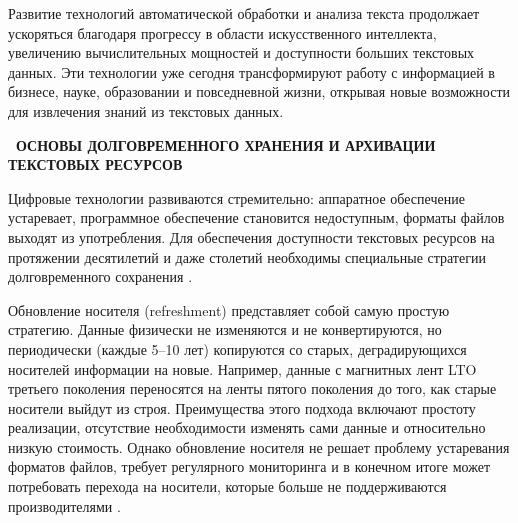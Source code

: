 \documentclass{SibFU-docs}
\begin{document}
Развитие технологий автоматической обработки и анализа текста продолжает ускоряться благодаря прогрессу в области искусственного интеллекта, увеличению вычислительных мощностей и доступности больших текстовых данных. Эти технологии уже сегодня трансформируют работу с информацией в бизнесе, науке, образовании и повседневной жизни, открывая новые возможности для извлечения знаний из текстовых данных.

\newpage

\begin{center}\textbf{\thesection\ ОСНОВЫ ДОЛГОВРЕМЕННОГО ХРАНЕНИЯ И АРХИВАЦИИ ТЕКСТОВЫХ РЕСУРСОВ}\end{center}
\vspace*{-1.5em}


Цифровые технологии развиваются стремительно: аппаратное обеспечение устаревает, программное обеспечение становится недоступным, форматы файлов выходят из употребления. Для обеспечения доступности текстовых ресурсов на протяжении десятилетий и даже столетий необходимы специальные стратегии долговременного сохранения \cite{Lucidea2024LongTermAccess, ETHLibrary2025DigitalPreservation}.

Обновление носителя (refreshment) представляет собой самую простую стратегию. Данные физически не изменяются и не конвертируются, но периодически (каждые 5–10 лет) копируются со старых, деградирующихся носителей информации на новые. Например, данные с магнитных лент LTO третьего поколения переносятся на ленты пятого поколения до того, как старые носители выйдут из строя. Преимущества этого подхода включают простоту реализации, отсутствие необходимости изменять сами данные и относительно низкую стоимость. Однако обновление носителя не решает проблему устаревания форматов файлов, требует регулярного мониторинга и в конечном итоге может потребовать перехода на носители, которые больше не поддерживаются производителями \cite{UniversityOfKentucky1994MassStorage}.
\end{document}
